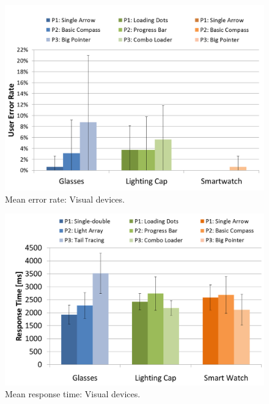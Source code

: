 \documentclass{sigchi}
\begin{document}
\begin{figure}[!t]
\centering
\includegraphics[width=\columnwidth]{Visual_ER}
\caption{Mean error rate: Visual devices.}
\label{fig:Visual_ER}
\end{figure}

\begin{figure}[!t]
\centering
\includegraphics[width=\columnwidth]{Visual_RT}
\caption{Mean response time: Visual devices.}
\label{fig:Visual_RT}
\end{figure}
\end{document}
